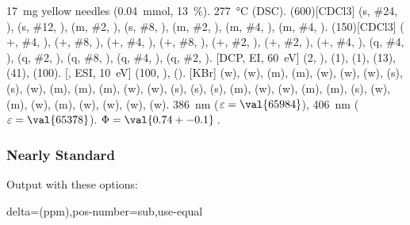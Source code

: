 \documentclass[load-preamble+]{cnltx-doc}
\begin{document}
\begin{sourcecode}
  \begin{experimental}[<optionen>]
     \SI{17}{\milli\gram} yellow needles (\SI{0.04}{\milli\mole},
      \SI{13}{\percent}).
     \SI{277}{\celsius} (DSC).
    \NMR(600)[CDCl3]  (s, \#{24}, ),  (s, \#{12},
    ),  (m, \#{2}, ),  (s, \#{8},
    ),  (m, \#{2}, ),  (m, \#{4},
    ),  (m, \#{4}, ).
    (150)[CDCl3]  ($+$, \#{4}, ),  ($+$,
    \#{8}, ),  ($+$, \#{4}, ),  ($+$, \#{8},
    ),  ($+$, \#{2}, ),  ($+$, \#{2},
    ),  ($+$, \#{4}, ),  (q, \#{4},
    ),  (q, \#{2}, ),  (q, \#{8}, ),
     (q, \#{4}, ),  (q, \#{2}, ).
    [DCP, EI, \SI{60}{\electronvolt}]  (2, ), 
    (1),  (1),  (13),  (41),  (100).
    [, ESI, \SI{10}{\electronvolt}]  (100,
    ),  ().
    [KBr]  (w),  (w),  (m), 
    (m),  (w),  (w),  (w),  (s),
     (s),  (w),  (m),  (m), 
    (m),  (w),  (w),  (s),  (s),
     (s),  (m),  (w),  (w), 
    (m),  (m),  (s),  (w),  (m), 
    (w),  (m),  (w),  (w),  (w), 
    (w).
     \SI{386}{\nano\metre} ($\varepsilon = \val{65984}$),
    \SI{406}{\nano\metre} ($\varepsilon = \val{65378}$).
     $\Phi = \val{0.74+-0.1}$\,.
  \end{experimental}
\end{sourcecode}

\subsubsection{Nearly Standard}

Output with these options:
\begin{sourcecode}
  delta=(ppm),pos-number=sub,use-equal
\end{sourcecode}
\end{document}
